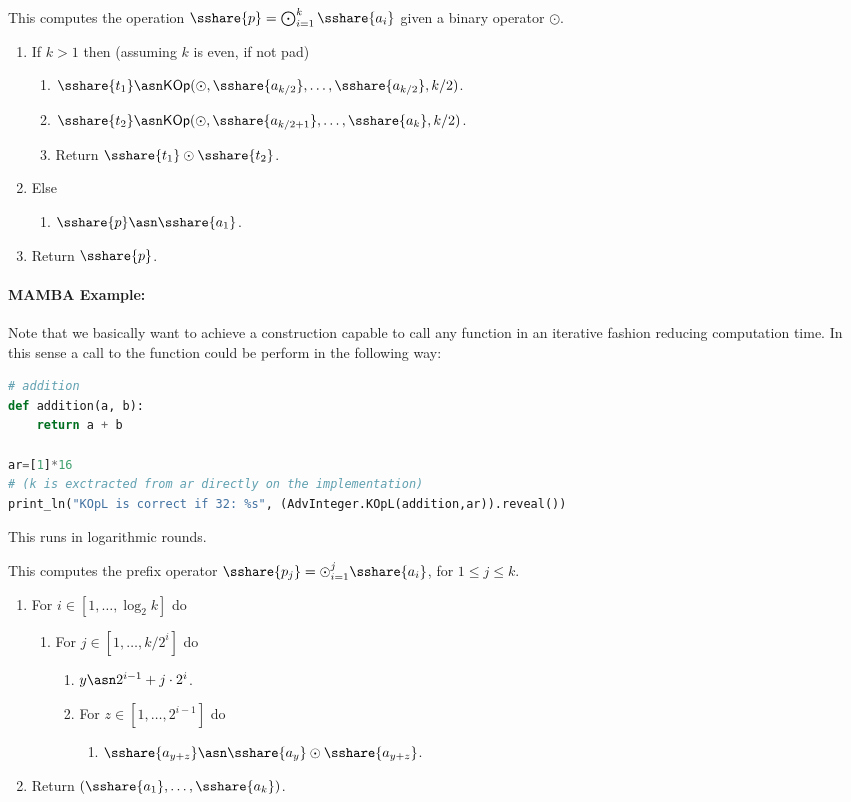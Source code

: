 This computes the operation $\sshare{p}= \bigodot_{i=1}^k \sshare{a_i}$
given a binary operator $\odot$.
\begin{enumerate}
\item If $k>1$ then (assuming $k$ is even, if not pad)
\begin{enumerate}
	\item $\sshare{t_1} \asn \mathsf{KOp}(\odot, \sshare{a_{k/2}},\ldots,\sshare{a_{k/2}},k/2)$.
	\item $\sshare{t_2} \asn \mathsf{KOp}(\odot, \sshare{a_{k/2+1}},\ldots,\sshare{a_k},k/2)$.
	\item Return $\sshare{t_1} \odot \sshare{t_2}$.
\end{enumerate}
\item Else
\begin{enumerate}
   \item $\sshare{p} \asn \sshare{a_1}$.
\end{enumerate}
\item Return $\sshare{p}$.
\end{enumerate}

\paragraph{MAMBA Example:} Note that we basically want to achieve a construction capable to call any function in an iterative fashion reducing computation time. In this sense a call to the function could be perform in the following way: 
\begin{lstlisting}[language={python}]
# addition
def addition(a, b):
    return a + b
    
ar=[1]*16
# (k is exctracted from ar directly on the implementation)
print_ln("KOpL is correct if 32: %s", (AdvInteger.KOpL(addition,ar)).reveal())
\end{lstlisting}
This runs in logarithmic rounds. 

This computes the prefix operator $\sshare{p_j} = \odot_{i=1}^j \sshare{a_i}$,
for $1 \le j \le k$.
\begin{enumerate}
\item For $i \in [1,\ldots, \log_2 k]$ do
\begin{enumerate}
  \item For $j \in [1,\ldots,k/2^i]$ do
  \begin{enumerate}
     \item $y \asn 2^{i-1}+j\cdot 2^i$.
     \item For $z \in [1,\ldots,2^{i-1}]$ do
     \begin{enumerate}
	\item $\sshare{a_{y+z}} \asn \sshare{a_y} \odot \sshare{a_{y+z}}$.
     \end{enumerate}
  \end{enumerate}
\end{enumerate}
\item Return $(\sshare{a_1},\ldots,\sshare{a_k})$.
\end{enumerate}

